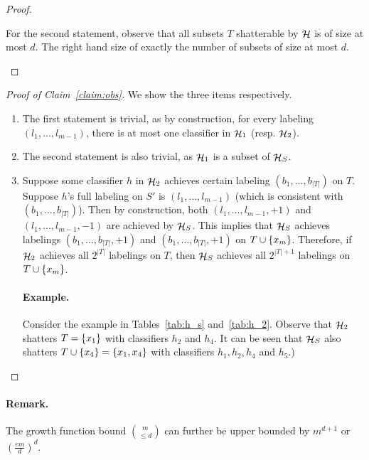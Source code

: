 \documentclass{article}
\DeclareMathOperator*{\Hcal}{{\cal H}}
\begin{document}
\begin{proof}
\begin{itemize}
For the second statement, observe that all subsets $T$ shatterable by $\Hcal$ is of size at most $d$. The right hand size of exactly the number of subsets of size at most $d$. \qedhere
\end{itemize}
\end{proof}

\begin{proof}[Proof of Claim~\ref{claim:obs}]
We show the three items respectively.
\begin{enumerate}
\item The first statement is trivial, as by construction, for every labeling $(l_1,\ldots,l_{m-1})$, there is at most one classifier in $\Hcal_1$ (resp. $\Hcal_2$).

\item The second statement is also trivial, as $\Hcal_1$ is a subset of $\Hcal_S$.

\item Suppose some classifier $h$ in $\Hcal_2$ achieves certain labeling $(b_1, \ldots, b_{|T|})$ on $T$.
Suppose $h$'s full labeling on $S'$ is $(l_1, \ldots, l_{m-1})$ (which is consistent with $(b_1, \ldots, b_{|T|})$). Then by construction, both $(l_1, \ldots, l_{m-1},+1)$ and $(l_1, \ldots, l_{m-1},-1)$ are achieved by $\Hcal_S$. This implies that $\Hcal_S$ achieves labelings
$(b_1, \ldots, b_{|T|},+1)$ and $(b_1, \ldots, b_{|T|},+1)$ on $T \cup \cbr{x_m}$. Therefore, if $\Hcal_2$ achieves all $2^{|T|}$ labelings on $T$, then $\Hcal_S$ achieves all $2^{|T|+1}$ labelings on $T \cup \cbr{x_m}$.

\paragraph{Example.} Consider the example in Tables~\ref{tab:h_s} and~\ref{tab:h_2}. Observe that $\Hcal_2$ shatters $T = \cbr{x_1}$ with classifiers $h_2$ and $h_4$.
It can be seen that $\Hcal_S$ also shatters $T \cup \cbr{x_4} = \cbr{x_1, x_4}$ with classifiers $h_1, h_2, h_4$ and $h_5$.)
\qedhere
\end{enumerate}
\end{proof}

\paragraph{Remark.} The growth function bound ${m \choose {\leq d}}$ can further be upper bounded by $m^{d+1}$ or $(\frac{em}{d})^d$.

\appendix
\end{document}

